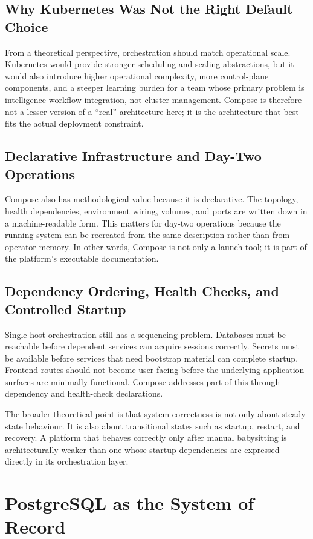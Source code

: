 \subsection{Why Kubernetes Was Not the Right Default Choice}
From a theoretical perspective, orchestration should match operational scale. Kubernetes would provide stronger scheduling and scaling abstractions, but it would also introduce higher operational complexity, more control-plane components, and a steeper learning burden for a team whose primary problem is intelligence workflow integration, not cluster management. Compose is therefore not a lesser version of a ``real'' architecture here; it is the architecture that best fits the actual deployment constraint.

\subsection{Declarative Infrastructure and Day-Two Operations}
Compose also has methodological value because it is declarative. The topology, health dependencies, environment wiring, volumes, and ports are written down in a machine-readable form. This matters for day-two operations because the running system can be recreated from the same description rather than from operator memory. In other words, Compose is not only a launch tool; it is part of the platform's executable documentation.

\subsection{Dependency Ordering, Health Checks, and Controlled Startup}
Single-host orchestration still has a sequencing problem. Databases must be reachable before dependent services can acquire sessions correctly. Secrets must be available before services that need bootstrap material can complete startup. Frontend routes should not become user-facing before the underlying application surfaces are minimally functional. Compose addresses part of this through dependency and health-check declarations.

The broader theoretical point is that system correctness is not only about steady-state behaviour. It is also about transitional states such as startup, restart, and recovery. A platform that behaves correctly only after manual babysitting is architecturally weaker than one whose startup dependencies are expressed directly in its orchestration layer.

\section{PostgreSQL as the System of Record}
